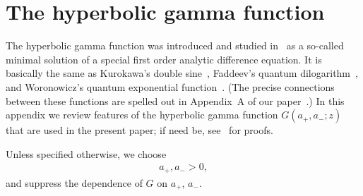 \documentclass[11pt]{article}
\numberwithin{equation}{section}
\newcommand{\aaa}{a_{+},a_{-}}
\begin{document}

																																												 
\section{The hyperbolic gamma function}\label{appendixA}

The  hyperbolic gamma function was introduced and studied in~\cite{fo} as a so-called minimal solution of a special f\/irst order analytic dif\/ference equation. It is basically the same as Kurokawa's double sine~\cite{kuro}, Faddeev's quantum dilogarithm~\cite{fadd2}, and Woronowicz's quantum exponential function~\cite{woro}. (The precise connections between these functions are spelled out in Appendix~A of our paper~\cite{Hels}.) In this appendix we review features of the hyperbolic gamma function $G(\aaa;z)$ that are used in the present paper; if need be, see~\cite{fo} for proofs.

Unless specif\/ied otherwise, we choose
\begin{gather}
\aaa >0,
\end{gather}
and suppress the dependence of $G$ on $a_+$, $a_-$.
\end{document}
